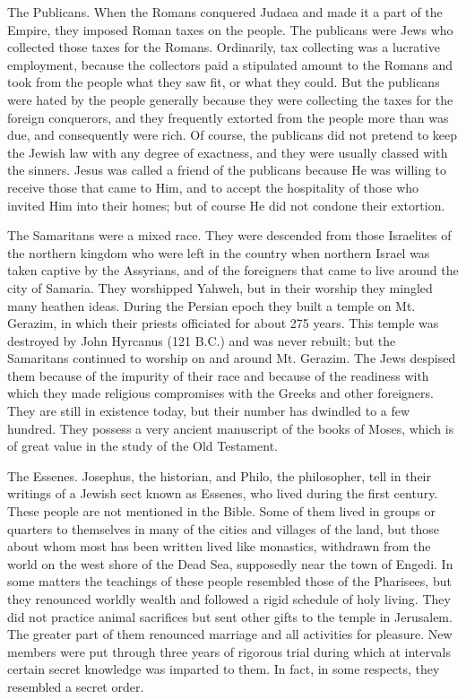 The Publicans. When the Romans conquered Judaea and made it a part of the Empire, they imposed Roman taxes on the people. The publicans were Jews who collected those taxes for the Romans. Ordinarily, tax collecting was a lucrative employment, because the collectors paid a stipulated amount to the Romans and took from the people what they saw fit, or what they could. But the publicans were hated by the people generally because they were collecting the taxes for the foreign conquerors, and they frequently extorted from the people more than was due, and consequently were rich. Of course, the publicans did not pretend to keep the Jewish law with any degree of exactness, and they were usually classed with the sinners. Jesus was called a friend of the publicans because He was willing to receive those that came to Him, and to accept the hospitality of those who invited Him into their homes; but of course He did not condone their extortion.

The Samaritans were a mixed race. They were descended from those Israelites of the northern kingdom who were left in the country when northern Israel was taken captive by the Assyrians, and of the foreigners that came to live around the city of Samaria. They worshipped Yahweh, but in their worship they mingled many heathen ideas. During the Persian epoch they built a temple on Mt. Gerazim, in which their priests officiated for about 275 years. This temple was destroyed by John Hyrcanus (121 B.C.) and was never rebuilt; but the Samaritans continued to worship on and around Mt. Gerazim. The Jews despised them because of the impurity of their race and because of the readiness with which they made religious compromises with the Greeks and other foreigners. They are still in existence today, but their number has dwindled to a few hundred. They possess a very ancient manuscript of the books of Moses, which is of great value in the study of the Old Testament.

The Essenes. Josephus, the historian, and Philo, the philosopher, tell in their writings of a Jewish sect known as Essenes, who lived during the first century. These people are not mentioned in the Bible. Some of them lived in groups or quarters to themselves in many of the cities and villages of the land, but those about whom most has been written lived like monastics, withdrawn from the world on the west shore of the Dead Sea, supposedly near the town of Engedi. In some matters the teachings of these people resembled those of the Pharisees, but they renounced worldly wealth and followed a rigid schedule of holy living. They did not practice animal sacrifices but sent other gifts to the temple in Jerusalem. The greater part of them renounced marriage and all activities for pleasure. New members were put through three years of rigorous trial during which at intervals certain secret knowledge was imparted to them. In fact, in some respects, they resembled a secret order.

